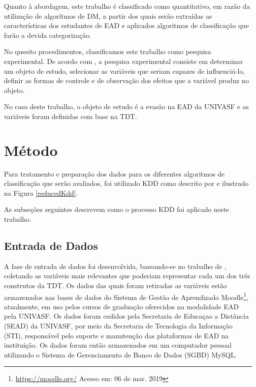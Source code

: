 Quanto à abordagem, este trabalho é classificado como quantitativo, em razão da
utilização de algorítmos de DM, a partir dos quais serão extraídas as
características dos estudantes de EAD e aplicados algoritmos de classificação
que farão a devida categorização.

No quesito procedimentos, classificamos este trabalho como pesquisa
experimental. De acordo com , a pesquisa
experimental consiste em determinar um objeto de estudo, selecionar as variáveis
que seriam capazes de influenciá-lo, definir as formas de controle e de
observação dos efeitos que a variável produz no objeto.

No caso deste trabalho, o objeto de estudo é a evasão na EAD da UNIVASF e as
variáveis foram definidas com base na TDT.

\section{Método}

Para tratamento e preparação dos dados para os diferentes algoritmos de
classificação que serão avaliados, foi utilizado KDD como descrito por
 e ilustrado na Figura \ref{reducedKdd}.


As subseções seguintes descrevem como o processo KDD foi aplicado neste
trabalho.

\subsection{Entrada de Dados}

A fase de entrada de dados foi desenvolvida, baseando-se no trabalho de
, coletando as variáveis mais relevantes que
poderiam representar cada um dos três construtos da TDT. Os dados das quais
foram retiradas as variáveis estão armazenados nas bases de dados do Sistema de
Gestão de Aprendizado Moodle\footnote{\url{https://moodle.org/} Acesso em: 06 de
mar. 2019}, atualmente, em uso pelos cursos de graduação oferecidos na
modalidade EAD pela UNIVASF. Os dados foram cedidos pela Secretaria de Educaçao a Distância
(SEAD) da UNIVASF, por meio da Secretaria de Tecnologia da Informação (STI), responsável pelo
suporte e manutenção das plataformas de EAD na instituição. Os dados foram então armazenados
em um computador pessoal utilizando o Sistema de Gerenciamento de Banco de Dados (SGBD) MySQL.

